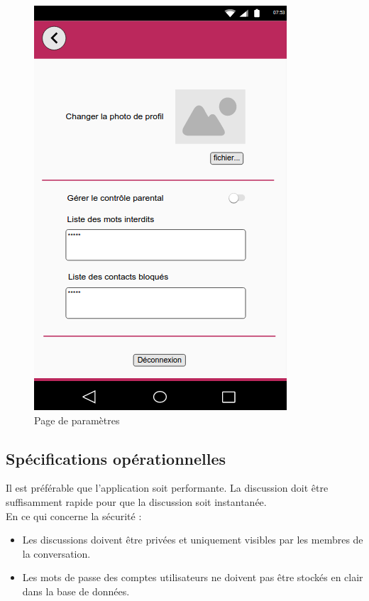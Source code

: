 	\begin{figure}[H]
		\centering \includegraphics[scale=0.5]{img/Parametres.png}
		\caption{Page de paramètres}
	\end{figure}


\subsection{Spécifications opérationnelles}

Il est préférable que l'application soit performante. La discussion doit être suffisamment rapide pour que la discussion soit instantanée. \\

En ce qui concerne la sécurité : \\

\begin{itemize}
	\item Les discussions doivent être privées et uniquement visibles par les membres de la conversation.
	\item Les mots de passe des comptes utilisateurs ne doivent pas être stockés en clair dans la base de données.
\end{itemize}
